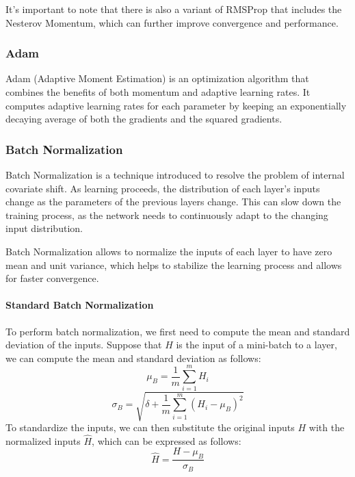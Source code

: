 It's important to note that there is also a variant of RMSProp that includes the Nesterov Momentum, which can further improve convergence and performance.

\subsubsection*{Adam}

Adam (Adaptive Moment Estimation) is an optimization algorithm that combines the benefits of both momentum and adaptive learning rates.
It computes adaptive learning rates for each parameter by keeping an exponentially decaying average of both the gradients and the squared gradients.

\subsubsection{Batch Normalization}
Batch Normalization is a technique introduced to resolve the problem of internal covariate shift. As learning proceeds, the distribution of each layer's inputs
change as the parameters of the previous layers change. 
This can slow down the training process, as the network needs to continuously adapt to the changing input distribution.

Batch Normalization allows to normalize the inputs of each layer to have zero mean and unit variance, which helps to stabilize the learning process and allows for faster convergence.

\paragraph{Standard Batch Normalization}
To perform batch normalization, we first need to compute the mean and standard deviation of the inputs.
Suppose that $H$ is the input of a mini-batch to a layer, we can compute the mean and standard deviation as follows:
\begin{equation*}
    \mu_B = \frac{1}{m} \sum_{i=1}^{m} H_i
\end{equation*}
\begin{equation*}
    \sigma_B = \sqrt{ \delta + \frac{1}{m} \sum_{i=1}^{m} (H_i - \mu_B)^2}
\end{equation*}
To standardize the inputs, we can then substitute the original inputs $H$ with the normalized inputs $\hat{H}$, which can be expressed as follows:
\begin{equation*}
    \hat{H} = \frac{H - \mu_B}{\sigma_B}
\end{equation*}

